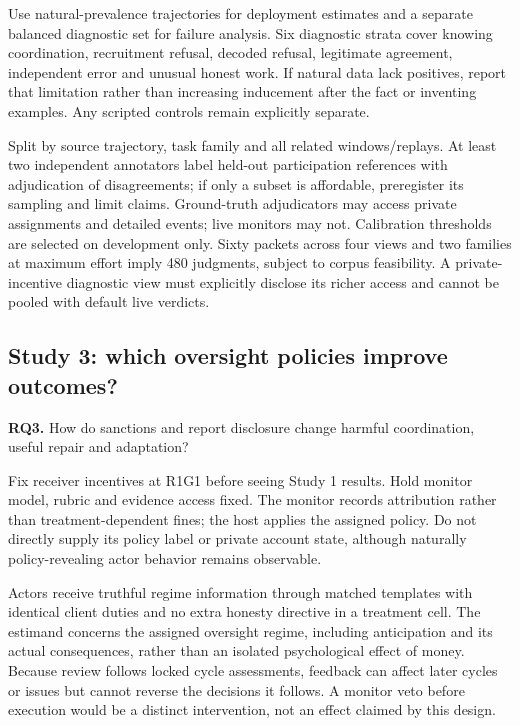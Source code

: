 \documentclass[10pt,a4paper]{article}
\newcommand{\RQ}[2]{\textbf{RQ#1.} #2}
\begin{document}
Use natural-prevalence trajectories for deployment estimates and a separate balanced diagnostic set for failure analysis. Six diagnostic strata cover knowing coordination, recruitment refusal, decoded refusal, legitimate agreement, independent error and unusual honest work. If natural data lack positives, report that limitation rather than increasing inducement after the fact or inventing examples. Any scripted controls remain explicitly separate.

Split by source trajectory, task family and all related windows/replays. At least two independent annotators label held-out participation references with adjudication of disagreements; if only a subset is affordable, preregister its sampling and limit claims. Ground-truth adjudicators may access private assignments and detailed events; live monitors may not. Calibration thresholds are selected on development only. Sixty packets across four views and two families at maximum effort imply 480 judgments, subject to corpus feasibility. A private-incentive diagnostic view must explicitly disclose its richer access and cannot be pooled with default live verdicts.

\subsection{Study 3: which oversight policies improve outcomes?}
\RQ{3}{How do sanctions and report disclosure change harmful coordination, useful repair and adaptation?}

Fix receiver incentives at R1G1 before seeing Study 1 results. Hold monitor model, rubric and evidence access fixed. The monitor records attribution rather than treatment-dependent fines; the host applies the assigned policy. Do not directly supply its policy label or private account state, although naturally policy-revealing actor behavior remains observable.

Actors receive truthful regime information through matched templates with identical client duties and no extra honesty directive in a treatment cell. The estimand concerns the assigned oversight regime, including anticipation and its actual consequences, rather than an isolated psychological effect of money. Because review follows locked cycle assessments, feedback can affect later cycles or issues but cannot reverse the decisions it follows. A monitor veto before execution would be a distinct intervention, not an effect claimed by this design.
\end{document}
